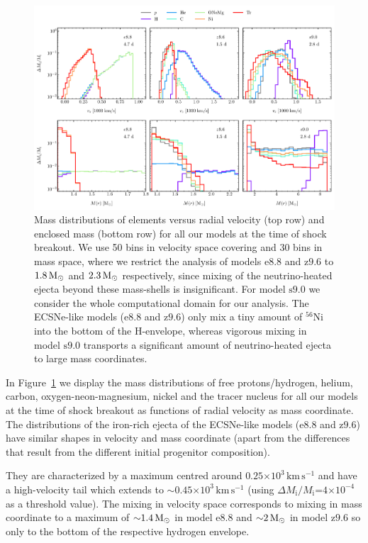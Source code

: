 \documentclass[fleqn,usenatbib]{mnras}
\newcommand{\nickel}{\ensuremath{\mathrm{^{56}Ni}}\xspace}
\newcommand{\solm}{\ensuremath{\rm{M_{\odot}}}\xspace}
\newcommand{\kms}{\ensuremath{\mathrm{km\, s^{-1}}}}
\newcommand{\onemg}{\ensuremath{\mathrm{e8.8}}\xspace}
\newcommand{\snine}{\ensuremath{\mathrm{s9.0}}\xspace}
\newcommand{\znine}{\ensuremath{\mathrm{z9.6}}\xspace}
\begin{document}
\begin{figure}%
 \centering
 \includegraphics[width=\textwidth,trim=0cm 0.0cm 0cm 0cm, clip]{pic/z96_s9_e8_3d_massDis_mvr_and_masstime_sbo_paper.pdf}
 \caption{Mass distributions of elements versus radial velocity (top row) and enclosed mass (bottom row) for all our models at the time of shock breakout. We use 50 bins in velocity space covering and 30 bins in mass space, where we restrict the analysis of models \onemg and \znine to $1.8\,\solm$ and $2.3\,\solm$ respectively, since mixing of the neutrino-heated ejecta beyond these mass-shells is insignificant. For model \snine we consider the whole computational domain for our analysis.
 The ECSNe-like models (\onemg and \znine) only mix a tiny amount of \nickel into the bottom of the H-envelope, whereas vigorous mixing in model \snine transports a significant amount of 
 neutrino-heated ejecta to large mass coordinates.}
 \label{fig:mass distribution sbo}
\end{figure}

In Figure~\ref{fig:mass distribution sbo} we display the mass distributions of free protons/hydrogen, helium, carbon, oxygen-neon-magnesium, nickel and the tracer nucleus for all our models at the time of shock breakout as functions of radial velocity as mass coordinate. 
The distributions of the iron-rich ejecta of the ECSNe-like models (\onemg and \znine) have similar shapes in velocity and mass coordinate (apart from the differences that result from the different initial progenitor composition). 

They are characterized by a maximum centred around $0.25\mathord{\times}10^3\,\kms$ and have a high-velocity tail which extends to $\mathord{\sim}0.45\mathord{\times}10^3\,\kms$ (using $\Delta M_{\mathrm{i}}/ M_{\mathrm{i}}\mathord{=}4\mathord{\times}10^{-4}$ as a threshold value). The mixing in velocity space corresponds to mixing in mass coordinate to a maximum of $\mathord{\sim}1.4\,\solm$ in model \onemg and $\mathord{\sim}2\,\solm$ in model \znine so only to the bottom of the respective hydrogen envelope. 
\end{document}
